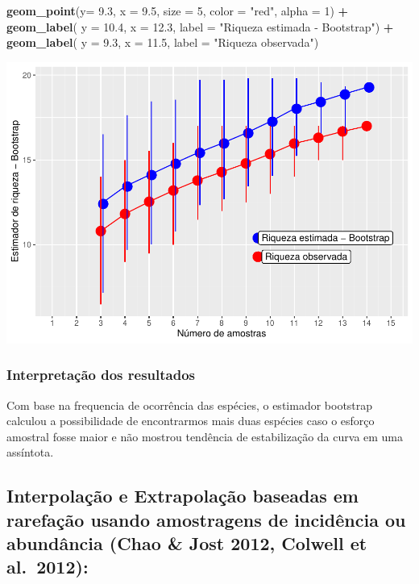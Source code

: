 \documentclass[
]{book}
\newenvironment{Shaded}{\begin{snugshade}}{\end{snugshade}}
\newcommand{\DataTypeTok}[1]{\textcolor[rgb]{0.13,0.29,0.53}{#1}}
\newcommand{\DecValTok}[1]{\textcolor[rgb]{0.00,0.00,0.81}{#1}}
\newcommand{\FloatTok}[1]{\textcolor[rgb]{0.00,0.00,0.81}{#1}}
\newcommand{\KeywordTok}[1]{\textcolor[rgb]{0.13,0.29,0.53}{\textbf{#1}}}
\newcommand{\NormalTok}[1]{#1}
\newcommand{\OperatorTok}[1]{\textcolor[rgb]{0.81,0.36,0.00}{\textbf{#1}}}
\newcommand{\StringTok}[1]{\textcolor[rgb]{0.31,0.60,0.02}{#1}}
\begin{document}
\begin{Shaded}
\begin{Highlighting}[]
\StringTok{  }\KeywordTok{geom_point}\NormalTok{(}\DataTypeTok{y=} \FloatTok{9.3}\NormalTok{, }\DataTypeTok{x =} \FloatTok{9.5}\NormalTok{, }\DataTypeTok{size =} \DecValTok{5}\NormalTok{, }\DataTypeTok{color =} \StringTok{"red"}\NormalTok{, }\DataTypeTok{alpha =} \DecValTok{1}\NormalTok{) }\OperatorTok{+}\StringTok{ }
\StringTok{  }\KeywordTok{geom_label}\NormalTok{( }\DataTypeTok{y =} \FloatTok{10.4}\NormalTok{, }\DataTypeTok{x =} \FloatTok{12.3}\NormalTok{, }\DataTypeTok{label =} \StringTok{"Riqueza estimada - Bootstrap"}\NormalTok{) }\OperatorTok{+}
\StringTok{  }\KeywordTok{geom_label}\NormalTok{( }\DataTypeTok{y =} \FloatTok{9.3}\NormalTok{, }\DataTypeTok{x =} \FloatTok{11.5}\NormalTok{, }\DataTypeTok{label =} \StringTok{"Riqueza observada"}\NormalTok{)}
\end{Highlighting}
\end{Shaded}

\includegraphics{livro_r_ecologia_files/figure-latex/unnamed-chunk-54-1.pdf}

\hypertarget{interpretauxe7uxe3o-dos-resultados-5}{%
\subsubsection{Interpretação dos resultados}\label{interpretauxe7uxe3o-dos-resultados-5}}

Com base na frequencia de ocorrência das espécies, o estimador bootstrap calculou a possibilidade de encontrarmos mais duas espécies caso o esforço amostral fosse maior e não mostrou tendência de estabilização da curva em uma assíntota.

\hypertarget{interpolauxe7uxe3o-e-extrapolauxe7uxe3o-baseadas-em-rarefauxe7uxe3o-usando-amostragens-de-inciduxeancia-ou-abunduxe2ncia-chao-jost-2012-colwell-et-al.-2012}{%
\subsection{Interpolação e Extrapolação baseadas em rarefação usando amostragens de incidência ou abundância (Chao \& Jost 2012, Colwell et al.~2012):}\label{interpolauxe7uxe3o-e-extrapolauxe7uxe3o-baseadas-em-rarefauxe7uxe3o-usando-amostragens-de-inciduxeancia-ou-abunduxe2ncia-chao-jost-2012-colwell-et-al.-2012}}
\end{document}
